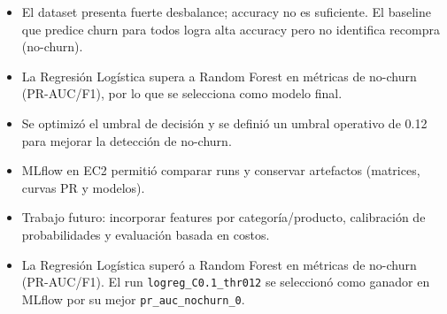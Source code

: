 \begin{itemize}
  \item El dataset presenta fuerte desbalance; accuracy no es suficiente. El baseline que predice churn para todos logra alta accuracy pero no identifica recompra (no-churn).
  \item La Regresión Logística supera a Random Forest en métricas de no-churn (PR-AUC/F1), por lo que se selecciona como modelo final.
  \item Se optimizó el umbral de decisión y se definió un umbral operativo de 0.12 para mejorar la detección de no-churn.
  \item MLflow en EC2 permitió comparar runs y conservar artefactos (matrices, curvas PR y modelos).
  \item Trabajo futuro: incorporar features por categoría/producto, calibración de probabilidades y evaluación basada en costos.
  \item La Regresión Logística superó a Random Forest en métricas de no-churn (PR-AUC/F1). El run \texttt{logreg\_C0.1\_thr012} se seleccionó como ganador en MLflow por su mejor \texttt{pr\_auc\_nochurn\_0}.
\end{itemize}